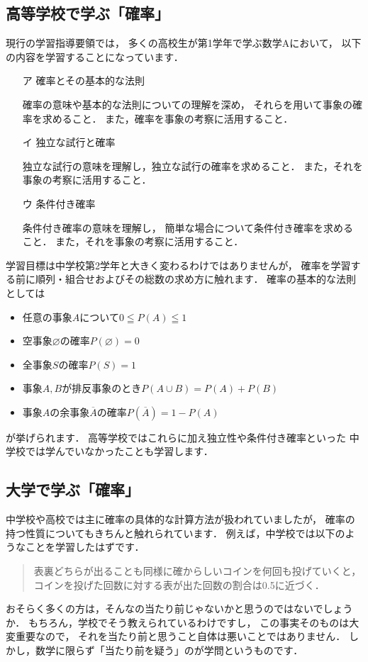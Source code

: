 \documentclass[./main]{subfiles} %
\theoremstyle{definition}
\begin{document}
\subsection{高等学校で学ぶ「確率」}

現行の学習指導要領では，
多くの高校生が第1学年で学ぶ数学Aにおいて，
以下の内容を学習することになっています．
\begin{itemize}
\item[ア]確率とその基本的な法則

確率の意味や基本的な法則についての理解を深め，
それらを用いて事象の確率を求めること．
また，確率を事象の考察に活用すること．
\item[イ]独立な試行と確率

独立な試行の意味を理解し，独立な試行の確率を求めること．
また，それを事象の考察に活用すること．
\item[ウ]条件付き確率

条件付き確率の意味を理解し，
簡単な場合について条件付き確率を求めること．
また，それを事象の考察に活用すること．
\end{itemize}
学習目標は中学校第2学年と大きく変わるわけではありませんが，
確率を学習する前に順列・組合せおよびその総数の求め方に触れます．
確率の基本的な法則としては
\begin{itemize}
\item 任意の事象$A$について$0\leqq P(A)\leqq1$
\item 空事象$\varnothing$の確率$P(\varnothing)=0$
\item 全事象$S$の確率$P(S)=1$
\item 事象$A,B$が排反事象のとき$P(A\cup B)=P(A)+P(B)$
\item 事象$A$の余事象$\overline{A}$の確率$P(\overline{A})=1-P(A)$
\end{itemize}
が挙げられます．
高等学校ではこれらに加え独立性や条件付き確率といった
中学校では学んでいなかったことも学習します．

\subsection{大学で学ぶ「確率」}

中学校や高校では主に確率の具体的な計算方法が扱われていましたが，
確率の持つ性質についてもきちんと触れられています．
例えば，中学校では以下のようなことを学習したはずです．
\begin{quote}
表裏どちらが出ることも同様に確からしいコインを何回も投げていくと，
コインを投げた回数に対する表が出た回数の割合は0.5に近づく．
\end{quote}
おそらく多くの方は，そんなの当たり前じゃないかと思うのではないでしょうか．
もちろん，学校でそう教えられているわけですし，
この事実そのものは大変重要なので，
それを当たり前と思うこと自体は悪いことではありません．
しかし，数学に限らず「当たり前を疑う」のが学問というものです．
\end{document}
